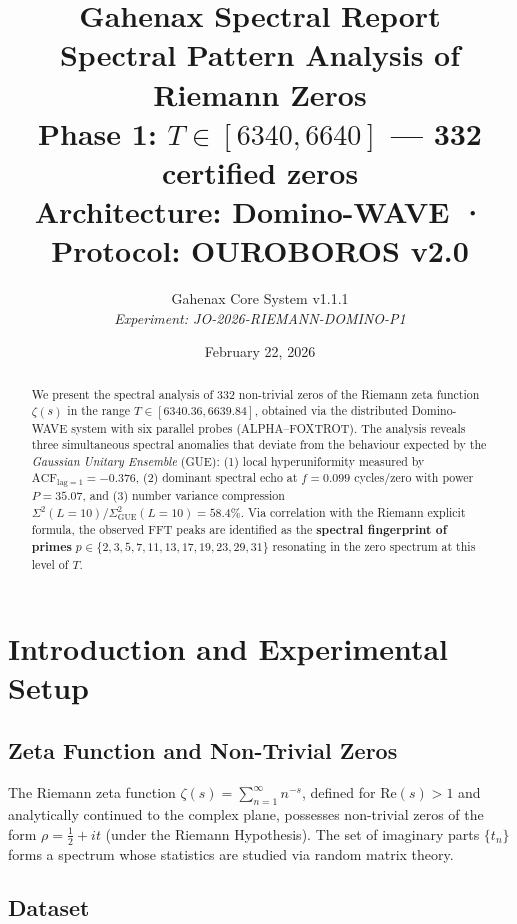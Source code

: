 \documentclass[12pt, a4paper]{article}
\title{
  \textbf{\textcolor{gahenax}{Gahenax Spectral Report}}\\[0.5em]
  {\large Spectral Pattern Analysis of Riemann Zeros}\\[0.3em]
  {\normalsize Phase 1: $T \in [6340, 6640]$ — 332 certified zeros}\\[0.3em]
  {\small Architecture: Domino-WAVE · Protocol: OUROBOROS v2.0}
}
\author{
  Gahenax Core System v1.1.1\\
  \textit{Experiment: JO-2026-RIEMANN-DOMINO-P1}
}
\date{February 22, 2026}
\begin{document}
\maketitle
\thispagestyle{fancy}

\begin{abstract}
We present the spectral analysis of 332 non-trivial zeros of the Riemann
zeta function $\zeta(s)$ in the range $T \in [6340.36, 6639.84]$,
obtained via the distributed Domino-WAVE system with six parallel probes
(ALPHA–FOXTROT). The analysis reveals three simultaneous spectral
anomalies that deviate from the behaviour expected by the
\emph{Gaussian Unitary Ensemble} (GUE): (1) local hyperuniformity
measured by $\mathrm{ACF}_{\mathrm{lag}=1} = -0.376$, (2) dominant spectral
echo at $f = 0.099$ cycles/zero with power $P = 35.07$, and (3) number
variance compression $\Sigma^2(L=10)/\Sigma^2_{\mathrm{GUE}}(L=10) = 58.4\%$.
Via correlation with the Riemann explicit formula, the observed FFT peaks
are identified as the \textbf{spectral fingerprint of primes}
$p \in \{2, 3, 5, 7, 11, 13, 17, 19, 23, 29, 31\}$
resonating in the zero spectrum at this level of $T$.
\end{abstract}

\tableofcontents
\newpage

\section{Introduction and Experimental Setup}

\subsection{Zeta Function and Non-Trivial Zeros}

The Riemann zeta function $\zeta(s) = \sum_{n=1}^{\infty} n^{-s}$,
defined for $\mathrm{Re}(s) > 1$ and analytically continued to the complex
plane, possesses non-trivial zeros of the form $\rho = \frac{1}{2} + it$
(under the Riemann Hypothesis). The set of imaginary parts
$\{t_n\}$ forms a spectrum whose statistics are studied via random
matrix theory.

\subsection{Dataset}
\end{document}
